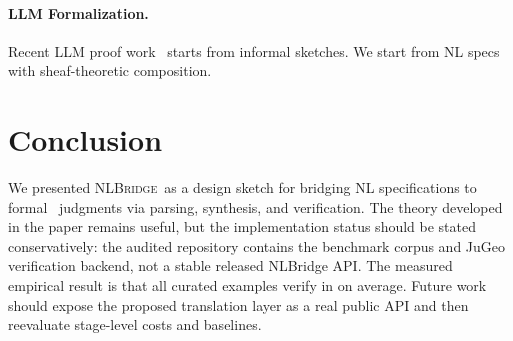 \documentclass[11pt]{article}
\newcommand{\NLBridge}{\textsc{NLBridge}}
\begin{document}
\paragraph{LLM Formalization.}
Recent LLM proof work~\cite{Jiang2022,First2023} starts from informal
sketches.  We start from NL specs with sheaf-theoretic composition.

\section{Conclusion}\label{sec:conclusion}

We presented \NLBridge\ as a design sketch for bridging NL specifications to
formal \JuGeo\ judgments via parsing, synthesis, and verification. The theory
developed in the paper remains useful, but the implementation status should be
stated conservatively: the audited repository contains the benchmark corpus
and JuGeo verification backend, not a stable released NLBridge API. The
measured empirical result is that all \ppLXXprogramCount{} curated examples
verify in \ppLXXtimeMean{} on average. Future work should expose the proposed
translation layer as a real public API and then reevaluate stage-level costs
and baselines.
\end{document}
